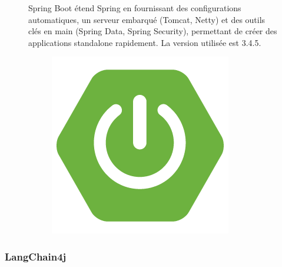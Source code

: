 \documentclass[12pt,a4paper]{report}
\begin{document}
	\begin{figure}[H]
		\begin{minipage}{0.8\textwidth}
			Spring Boot étend Spring en fournissant des configurations automatiques, un serveur embarqué (Tomcat, Netty) et des outils clés en main (Spring Data, Spring Security), permettant de créer des applications standalone rapidement. La version utilisée est 3.4.5.
		\end{minipage}
		\hfill
		\begin{minipage}{0.15\textwidth} 
			\begin{figure}[H]
				\centering
				\includegraphics[width=\linewidth]{spring-boot-logo.png}
				\label{fig:spring-boot-logo}
			\end{figure}
		\end{minipage}
	\end{figure}
	
	
	\subsubsection{LangChain4j}
	
\end{document}
